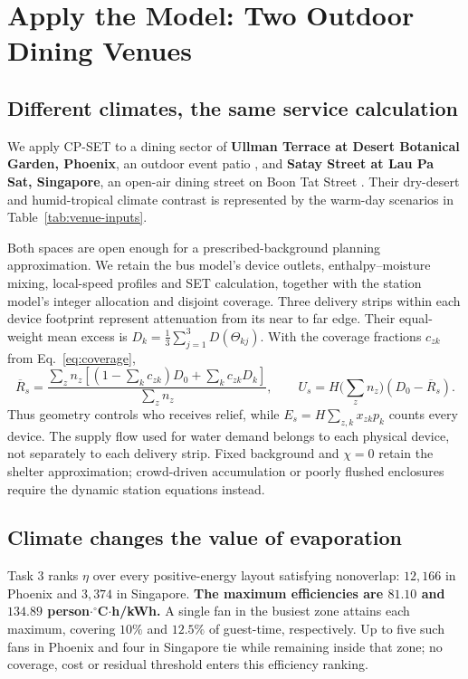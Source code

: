 \section[Venue applications]{Apply the Model: Two Outdoor Dining Venues}
\label{sec:applications}

\subsection{Different climates, the same service calculation}
We apply CP-SET to a dining sector of \textbf{Ullman Terrace at Desert Botanical Garden, Phoenix}, an outdoor event patio \cite{ullman}, and \textbf{Satay Street at Lau Pa Sat, Singapore}, an open-air dining street on Boon Tat Street \cite{satay-street}. Their dry-desert and humid-tropical climate contrast is represented by the warm-day scenarios in Table~\ref{tab:venue-inputs}.

Both spaces are open enough for a prescribed-background planning approximation. We retain the bus model's device outlets, enthalpy--moisture mixing, local-speed profiles and SET calculation, together with the station model's integer allocation and disjoint coverage. Three delivery strips within each device footprint represent attenuation from its near to far edge. Their equal-weight mean excess is $D_k=\frac13\sum_{j=1}^{3}D(\Theta_{kj})$. With the coverage fractions $c_{zk}$ from Eq.~\eqref{eq:coverage},
\begin{equation}
 \overline R_s=\frac{\sum_z n_z\left[(1-\sum_k c_{zk})D_0+
                  \sum_k c_{zk}D_k\right]}{\sum_z n_z},\qquad
 U_s=H\Big(\sum_z n_z\Big)(D_0-\overline R_s).
\label{eq:venue-service}
\end{equation}
Thus geometry controls who receives relief, while $E_s=H\sum_{z,k}x_{zk}p_k$ counts every device. The supply flow used for water demand belongs to each physical device, not separately to each delivery strip. Fixed background and $\chi=0$ retain the shelter approximation; crowd-driven accumulation or poorly flushed enclosures require the dynamic station equations instead.

\subsection{Climate changes the value of evaporation}
Task 3 ranks $\eta$ over every positive-energy layout satisfying nonoverlap: $12{,}166$ in Phoenix and $3{,}374$ in Singapore. \textbf{The maximum efficiencies are $81.10$ and $134.89$ person$\cdot{}^\circ$C$\cdot$h/kWh.} A single fan in the busiest zone attains each maximum, covering $10\%$ and $12.5\%$ of guest-time, respectively. Up to five such fans in Phoenix and four in Singapore tie while remaining inside that zone; no coverage, cost or residual threshold enters this efficiency ranking.

